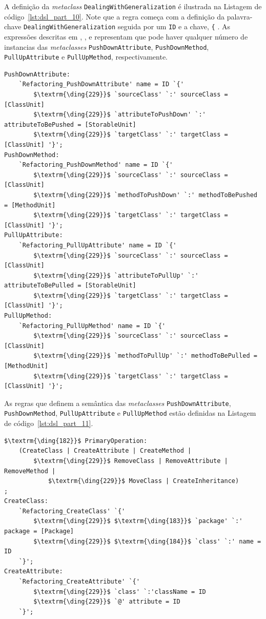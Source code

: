 A definição da \textit{metaclass} \texttt{DealingWithGeneralization} é ilustrada na Listagem de código~\ref{lst:dsl_part_10}. Note que a regra começa com a definição da palavra-chave \texttt{DealingWithGeneralization} seguida por um \texttt{ID} e a chave, \texttt{\{} . As expressões descritas em , ,  e  representam que pode haver qualquer número de instancias das \textit{metaclasses} \texttt{PushDownAttribute}, \texttt{PushDownMethod}, \texttt{PullUpAttribute} e \texttt{PullUpMethod}, respectivamente.

\begin{lstlisting}[language=Xtext, frame=single, basicstyle=\scriptsize, mathescape=true, label={lst:dsl_part_11}, caption={Gramática da DSL - parte 11}]
PushDownAttribute: 
	`Refactoring_PushDownAttribute' name = ID `{'
		$\textrm{\ding{229}}$ `sourceClass' `:' sourceClass = [ClassUnit]
		$\textrm{\ding{229}}$ `attributeToPushDown' `:' attributeToBePushed = [StorableUnit]
		$\textrm{\ding{229}}$ `targetClass' `:' targetClass = [ClassUnit] '}';
PushDownMethod: 
	`Refactoring_PushDownMethod' name = ID `{'
		$\textrm{\ding{229}}$ `sourceClass' `:' sourceClass = [ClassUnit]
		$\textrm{\ding{229}}$ `methodToPushDown' `:' methodToBePushed = [MethodUnit]
		$\textrm{\ding{229}}$ `targetClass' `:' targetClass = [ClassUnit] '}';
PullUpAttribute: 
	`Refactoring_PullUpAttribute' name = ID `{'
		$\textrm{\ding{229}}$ `sourceClass' `:' sourceClass = [ClassUnit]
		$\textrm{\ding{229}}$ `attributeToPullUp' `:' attributeToBePulled = [StorableUnit]
		$\textrm{\ding{229}}$ `targetClass' `:' targetClass = [ClassUnit] '}';
PullUpMethod: 
	`Refactoring_PullUpMethod' name = ID `{'
		$\textrm{\ding{229}}$ `sourceClass' `:' sourceClass = [ClassUnit]
		$\textrm{\ding{229}}$ `methodToPullUp' `:' methodToBePulled = [MethodUnit]
		$\textrm{\ding{229}}$ `targetClass' `:' targetClass = [ClassUnit] '}';
\end{lstlisting} 

As regras que definem a semântica das \textit{metaclasses} \texttt{PushDownAttribute}, \texttt{PushDownMethod}, \texttt{PullUpAttribute} e \texttt{PullUpMethod} estão definidas na Listagem de código~\ref{lst:dsl_part_11}.

\begin{lstlisting}[language=Xtext, frame=single, basicstyle=\scriptsize, mathescape=true, label={lst:dsl_part_12}, caption={Gramática da DSL - parte 12}]
$\textrm{\ding{182}}$ PrimaryOperation:
	(CreateClass | CreateAttribute | CreateMethod | 
		$\textrm{\ding{229}}$ RemoveClass | RemoveAttribute | RemoveMethod | 
			$\textrm{\ding{229}}$ MoveClass | CreateInheritance)
;
CreateClass: 
	`Refactoring_CreateClass' `{'
		$\textrm{\ding{229}}$ $\textrm{\ding{183}}$ `package' `:' package = [Package]
		$\textrm{\ding{229}}$ $\textrm{\ding{184}}$ `class' `:' name = ID
	`}';
CreateAttribute: 
	`Refactoring_CreateAttribute' `{'
		$\textrm{\ding{229}}$ `class' `:'className = ID
		$\textrm{\ding{229}}$ `@' attribute = ID 
	`}';
\end{lstlisting}

